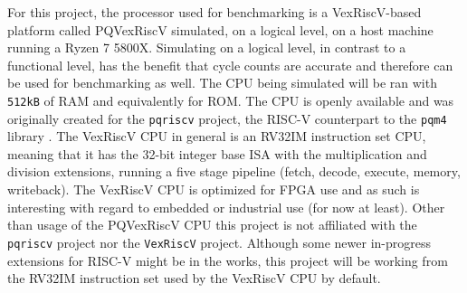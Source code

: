 For this project, the processor used for benchmarking is a VexRiscV-based platform called PQVexRiscV simulated, on a logical level, on a host machine running a Ryzen 7 5800X. Simulating on a logical level, in contrast to a functional level, has the benefit that cycle counts are accurate and therefore can be used for benchmarking as well. The CPU being simulated will be ran with \texttt{512kB} of RAM and equivalently for ROM. The CPU is openly available and was originally created for the \texttt{pqriscv} project, the RISC-V counterpart to the \texttt{pqm4} library \cite{pqvex}. The VexRiscV CPU in general is an RV32IM instruction set CPU, meaning that it has the 32-bit integer base ISA with the multiplication and division extensions, running a five stage pipeline (fetch, decode, execute, memory, writeback). The VexRiscV CPU is optimized for FPGA use \cite{vexriscv} and as such is interesting with regard to embedded or industrial use (for now at least). Other than usage of the PQVexRiscV CPU this project is not affiliated with the \texttt{pqriscv} project nor the \texttt{VexRiscV} project. Although some newer in-progress extensions for RISC-V might be in the works, this project will be working from the RV32IM instruction set used by the VexRiscV CPU by default.